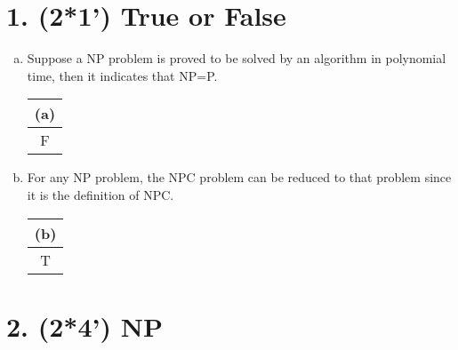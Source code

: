 \documentclass{article}
\begin{document}
\section*{1. (2*1') True or False}
\begin{enumerate}[(a)]
	\item Suppose a NP problem is proved to be solved by an algorithm in polynomial time, then it indicates that NP=P.\\
	\vspace{1em}
	\begin{tabular}{|c|}
		\hline
		(a)\\
		\hline
		{\color{blue}F} \\
		\hline
	\end{tabular}
	\item For any NP problem, the NPC problem can be reduced to that problem since it is the definition of NPC.\\
	\vspace{1em}
	\begin{tabular}{|c|}
		\hline
		(b)\\
		\hline
		{\color{blue}T}  \\
		\hline
	\end{tabular}
\end{enumerate}
\vspace{0.5in}

\section*{2. (2*4') NP}
\end{document}
